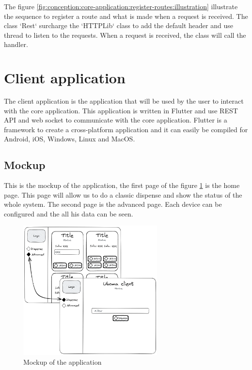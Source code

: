 The figure \ref{fig:conception:core-application:register-routes:illustration} illustrate the sequence to register a route and what is made when a request is received.
The class `Rest` surcharge the `HTTPLib` class to add the default header and use thread to listen to the requests.
When a request is received, the class will call the handler.


\section{Client application}
\label{conception:client-application}

The client application is the application that will be used by the user to interact with the core application.
This application is written in Flutter and use REST API and web socket to communicate with the core application.
Flutter is a framework to create a cross-platform application and it can easily be compiled for Android, iOS, Windows, Linux and MacOS.

\subsection{Mockup}
\label{conception:client-application:mockup}

This is the mockup of the application, the first page of the figure \ref{fig:conception:client-application:mockup:illustration} is the home page.
This page will allow us to do a classic dispense and show the status of the whole system.
The second page is the advanced page.
Each device can be configured and the all his data can be seen.

\begin{figure}[h]
  \centering
  \includegraphics[width=0.65\textwidth]{img/conception_clientApp.excalidraw.png}
  \caption{Mockup of the application}
  \label{fig:conception:client-application:mockup:illustration}
\end{figure}

